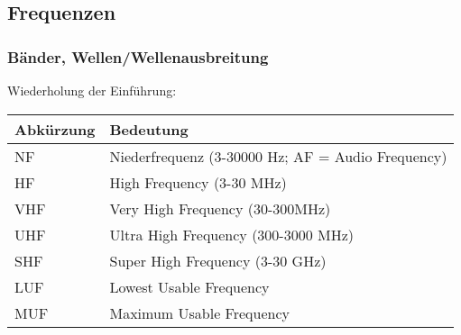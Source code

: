\subsection*{Frequenzen}
\begin{frame}
    \frametitle{Bänder, Wellen/Wellenausbreitung}

    Wiederholung der Einführung:

    \begin{center}
    \footnotesize
    \begin{tabular}{|l|l|}\hline
        \textbf{Abkürzung} & \textbf{Bedeutung}                         \\ \hline \hline
        NF    & Niederfrequenz (3-30000 Hz; AF = Audio Frequency)       \\ \hline
        HF    & High Frequency (3-30 MHz)                               \\ \hline
        VHF   & Very High Frequency (30-300MHz)                         \\ \hline
        UHF   & Ultra High Frequency (300-3000 MHz)                     \\ \hline
        SHF   & Super High Frequency (3-30 GHz)                         \\ \hline
        LUF   & Lowest Usable Frequency                                 \\ \hline
        MUF   & Maximum Usable Frequency                                \\ \hline
    \end{tabular}
    \end{center}

\end{frame}


